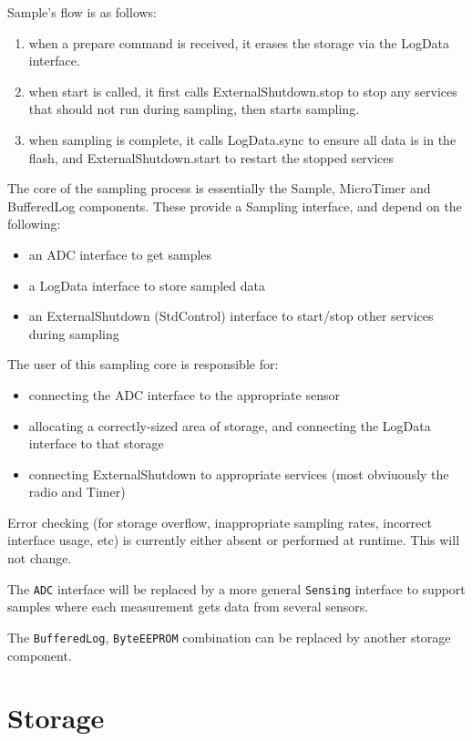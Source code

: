 \documentclass{article}
\newcommand{\code}[1]{{\tt #1}}
\begin{document}
Sample's flow is as follows:
\begin{enumerate}
\item when a prepare command is received, it erases the storage via the 
LogData interface.
\item when start is called, it first calls ExternalShutdown.stop to stop any
services that should not run during sampling, then starts sampling.
\item when sampling is complete, it calls LogData.sync to ensure all data
is in the flash, and ExternalShutdown.start to restart the stopped services
\end{enumerate}

The core of the sampling process is essentially the Sample, MicroTimer
and BufferedLog components. These provide a Sampling interface, and
depend on the following:
\begin{itemize}
\item an ADC interface to get samples
\item a LogData interface to store sampled data
\item an ExternalShutdown (StdControl) interface to start/stop other services
during sampling
\end{itemize}

The user of this sampling core is responsible for:
\begin{itemize}
\item connecting the ADC interface to the appropriate sensor
\item allocating a correctly-sized area of storage, and connecting the LogData
interface to that storage
\item connecting ExternalShutdown to appropriate services (most obviuously
the radio and Timer)
\end{itemize}

Error checking (for storage overflow, inappropriate sampling rates, 
incorrect interface usage, etc) is currently either absent or performed
at runtime. This will not change.

The \code{ADC} interface will be replaced by a more general \code{Sensing}
interface to support samples where each measurement gets data from several
sensors.

The \code{BufferedLog}, \code{ByteEEPROM} combination can be replaced by
another storage component.

\section{Storage}
\end{document}
